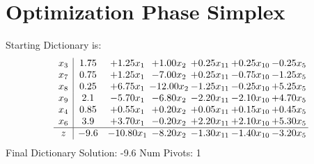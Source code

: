 \documentclass[9pt]{article}
\begin{document}
\section{Optimization Phase Simplex}
Starting Dictionary is:
\[\begin{array}{c| c c@{\hskip 2pt} c@{\hskip 2pt} c@{\hskip 2pt} c@{\hskip 2pt} c@{\hskip 2pt} }
 x_{3}   &  1.75 & +  1.25 x_{1} & +  1.00 x_{2} & +  0.25 x_{11} & +  0.25 x_{10} & -0.25 x_{5}\\
 x_{7}   &  0.75 & +  1.25 x_{1} & -7.00 x_{2} & +  0.25 x_{11} & -0.75 x_{10} & -1.25 x_{5}\\
 x_{8}   &  0.25 & +  6.75 x_{1} & -12.00 x_{2} & -1.25 x_{11} & -0.25 x_{10} & +  5.25 x_{5}\\
 x_{9}   &  2.1 & -5.70 x_{1} & -6.80 x_{2} & -2.20 x_{11} & -2.10 x_{10} & +  4.70 x_{5}\\
 x_{4}   &  0.85 & +  0.55 x_{1} & +  0.20 x_{2} & +  0.05 x_{11} & +  0.15 x_{10} & +  0.45 x_{5}\\
 x_{6}   &  3.9 & +  3.70 x_{1} & -0.20 x_{2} & +  2.20 x_{11} & +  2.10 x_{10} & +  5.30 x_{5}\\
\hline
z    &  -9.6 & -10.80 x_{1} & -8.20 x_{2} & -1.30 x_{11} & -1.40 x_{10} & -3.20 x_{5}\\
\end{array}\]
Final Dictionary
Solution:  -9.6
Num Pivots:  1
\end{document}
